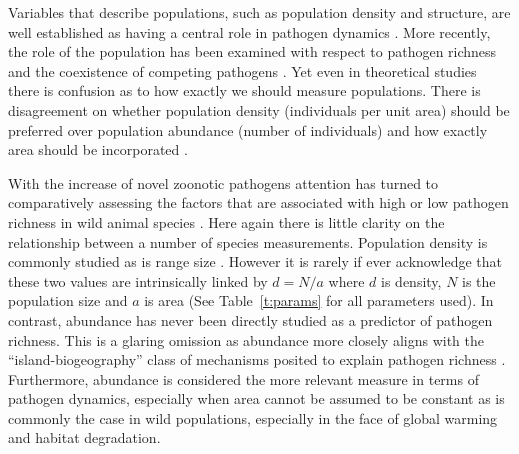 
Variables that describe populations, such as population density and structure, are well established as having a central role in pathogen dynamics \cite{colizza2007invasion, barthelemy2010fluctuation, colizza2007invasion,  wu2013threshold, may1979population, anderson1979population}.
More recently, the role of the population has been examined with respect to pathogen richness and the coexistence of competing pathogens \cite{qiu2013vector, allen2004sis, nunes2006localized}.
Yet even in theoretical studies there is confusion as to how exactly we should measure populations.
There is disagreement on whether population density (individuals per unit area) should be preferred over population abundance (number of individuals) \cite{begon2002clarification} and how exactly area should be incorporated \cite{begon2002clarification}. 


With the increase of novel zoonotic pathogens \cite{jones2008global} attention has turned to comparatively assessing the factors that are associated with high or low pathogen richness in wild animal species \cite{poulin2000diversity}.
Here again there is little clarity on the relationship between a number of species measurements.
Population density is commonly studied \cite{morand1998density, kamiya2014determines, lindenfors2007parasite, nunn2003comparative, arneberg2002host} as is range size \cite{lindenfors2007parasite, nunn2003comparative, turmelle2009correlates, huang2015parasite, kamiya2014determines}.
However it is rarely if ever acknowledge that these two values are intrinsically linked by $d = N/a$ where $d$ is density, $N$ is the population size and $a$ is area (See Table~\ref{t:params} for all parameters used).
In contrast, abundance has never been directly studied as a predictor of pathogen richness.
This is a glaring omission as abundance more closely aligns with the ``island-biogeography'' class of mechanisms posited to explain pathogen richness \cite{}.
Furthermore, abundance is considered the more relevant measure in terms of pathogen dynamics, especially when area cannot be assumed to be constant \cite{begon2002clarification} as is commonly the case in wild populations, especially in the face of global warming and habitat degradation.

